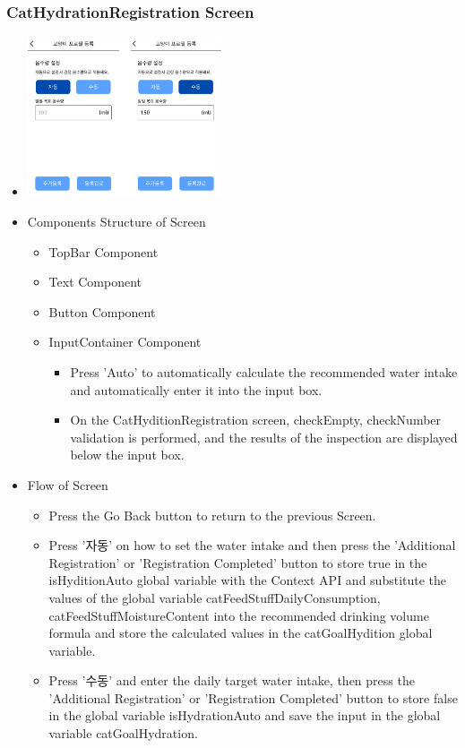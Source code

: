 \documentclass[conference]{IEEEtran}
\begin{document}
\subsubsection{CatHydrationRegistration Screen}
\begin{itemize}
    \item[] \includegraphics[width=0.45\textwidth]{img/D/14.png}
    \item Components Structure of Screen
    \begin{itemize}
        \item TopBar Component
        \item Text Component
        \item Button Component
        \item InputContainer Component
        \begin{itemize}
            \item Press 'Auto' to automatically calculate the recommended water intake and automatically enter it into the input box.
            \item On the CatHyditionRegistration screen, checkEmpty, checkNumber validation is performed, and the results of the inspection are displayed below the input box.
        \end{itemize}
    \end{itemize}
    \item Flow of Screen
    \begin{itemize}
        \item Press the Go Back button to return to the previous Screen.
        \item Press '자동' on how to set the water intake and then press the 'Additional Registration' or 'Registration Completed' button to store true in the isHyditionAuto global variable with the Context API and substitute the values of the global variable catFeedStuffDailyConsumption, catFeedStuffMoistureContent into the recommended drinking volume formula and store the calculated values in the catGoalHydition global variable.
        \item Press '수동' and enter the daily target water intake, then press the 'Additional Registration' or 'Registration Completed' button to store false in the global variable isHydrationAuto and save the input in the global variable catGoalHydration.

\end{itemize}
\end{itemize}
\end{document}
